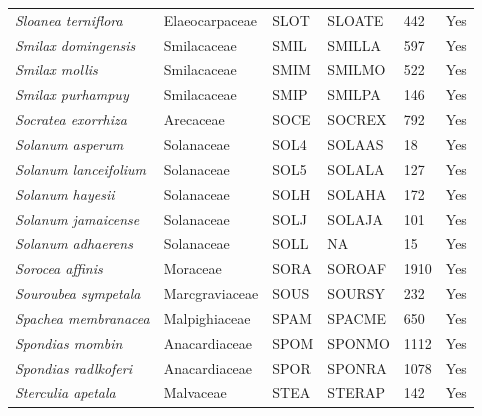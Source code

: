 \documentclass[11pt]{article}
\begin{document}
\begin{longtable}{@{}llllll@{}}
\textit{Sloanea terniflora}                           & Elaeocarpaceae   & SLOT   & SLOATE & 442             & Yes       \\
\textit{Smilax domingensis}                           & Smilacaceae      & SMIL   & SMILLA & 597             & Yes       \\
\textit{Smilax mollis}                                & Smilacaceae      & SMIM   & SMILMO & 522             & Yes       \\
\textit{Smilax purhampuy}                             & Smilacaceae      & SMIP   & SMILPA & 146             & Yes       \\
\textit{Socratea exorrhiza}                           & Arecaceae        & SOCE   & SOCREX & 792             & Yes       \\
\textit{Solanum asperum}                              & Solanaceae       & SOL4   & SOLAAS & 18              & Yes       \\
\textit{Solanum lanceifolium}                         & Solanaceae       & SOL5   & SOLALA & 127             & Yes       \\
\textit{Solanum hayesii}                              & Solanaceae       & SOLH   & SOLAHA & 172             & Yes       \\
\textit{Solanum jamaicense}                           & Solanaceae       & SOLJ   & SOLAJA & 101             & Yes       \\
\textit{Solanum adhaerens}                            & Solanaceae       & SOLL   & NA     & 15              & Yes       \\
\textit{Sorocea affinis}                              & Moraceae         & SORA   & SOROAF & 1910            & Yes       \\
\textit{Souroubea sympetala}                          & Marcgraviaceae   & SOUS   & SOURSY & 232             & Yes       \\
\textit{Spachea membranacea}                          & Malpighiaceae    & SPAM   & SPACME & 650             & Yes       \\
\textit{Spondias mombin}                              & Anacardiaceae    & SPOM   & SPONMO & 1112            & Yes       \\
\textit{Spondias radlkoferi}                          & Anacardiaceae    & SPOR   & SPONRA & 1078            & Yes       \\
\textit{Sterculia apetala}                            & Malvaceae        & STEA   & STERAP & 142             & Yes       \\

\end{longtable}
\end{document}
